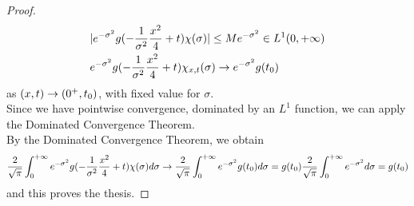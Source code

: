 \begin{itemize}
\begin{ProofBox}
\begin{proof}
\begin{equation*}
\begin{split}
                    &|e^{-\sigma^2} g(-\frac{1}{\sigma^2}\frac{x^2}{4}+t) \chi(\sigma)| \leq M e^{-\sigma^2} \in L^1(0,+\infty)\\
                    & e^{-\sigma^2} g(-\frac{1}{\sigma^2}\frac{x^2}{4}+t) \chi_{x,t}(\sigma)\rightarrow e^{-\sigma^2}g(t_0)
                \end{split}
            \end{equation*}
            as $(x,t) \rightarrow (0^+,t_0)$, with fixed value for $\sigma$. \\
            Since we have pointwise convergence, dominated by an $L^1$ function, we can apply the Dominated Convergence Theorem. \\
            By the Dominated Convergence Theorem, we obtain
            \begin{equation*}
                \frac{2}{\sqrt{\pi}} \int_0^{+\infty} e^{-\sigma^2} g(-\frac{1}{\sigma^2}\frac{x^2}{4}+t) \chi(\sigma) d\sigma \rightarrow \frac{2}{\sqrt{\pi}} \int_0^{+\infty} e^{-\sigma^2}g(t_0) d\sigma = g(t_0) \frac{2}{\sqrt{\pi}} \int_0^{+\infty} e^{-\sigma^2}d\sigma = g(t_0)
            \end{equation*}
            and this proves the thesis. 
        \end{proof}
    \end{ProofBox}
\end{itemize}


